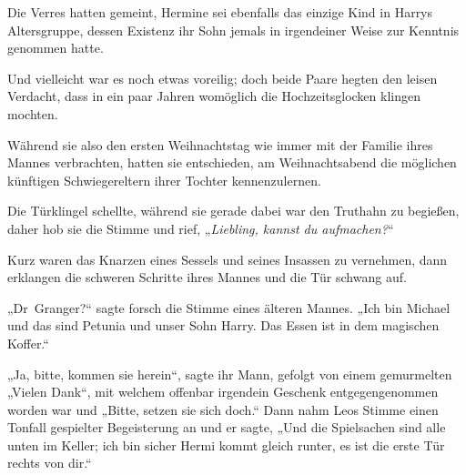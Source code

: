Die Verres hatten gemeint, Hermine sei ebenfalls das einzige Kind in Harrys Altersgruppe, dessen Existenz ihr Sohn jemals in irgendeiner Weise zur Kenntnis genommen hatte.

Und vielleicht war es noch etwas voreilig; doch beide Paare hegten den leisen Verdacht, dass in ein paar Jahren womöglich die Hochzeitsglocken klingen mochten.

Während sie also den ersten Weihnachtstag wie immer mit der Familie ihres Mannes verbrachten, hatten sie entschieden, am Weihnachtsabend die möglichen künftigen Schwiegereltern ihrer Tochter kennenzulernen.

Die Türklingel schellte, während sie gerade dabei war den Truthahn zu begießen, daher hob sie die Stimme und rief,
„\emph{Liebling, kannst du aufmachen?}“

Kurz waren das Knarzen eines Sessels und seines Insassen zu vernehmen, dann erklangen die schweren Schritte ihres Mannes und die Tür schwang auf.

„Dr~Granger?“ sagte forsch die Stimme eines älteren Mannes.
„Ich bin Michael und das sind Petunia und unser Sohn Harry. Das Essen ist in dem magischen Koffer.“

„Ja, bitte, kommen sie herein“, sagte ihr Mann, gefolgt von einem gemurmelten
„Vielen Dank“, mit welchem offenbar irgendein Geschenk entgegengenommen worden war und
„Bitte, setzen sie sich doch.“ Dann nahm Leos Stimme einen Tonfall gespielter Begeisterung an und er sagte,
„Und die Spielsachen sind alle unten im Keller; ich bin sicher Hermi kommt gleich runter, es ist die erste Tür rechts von dir.“

